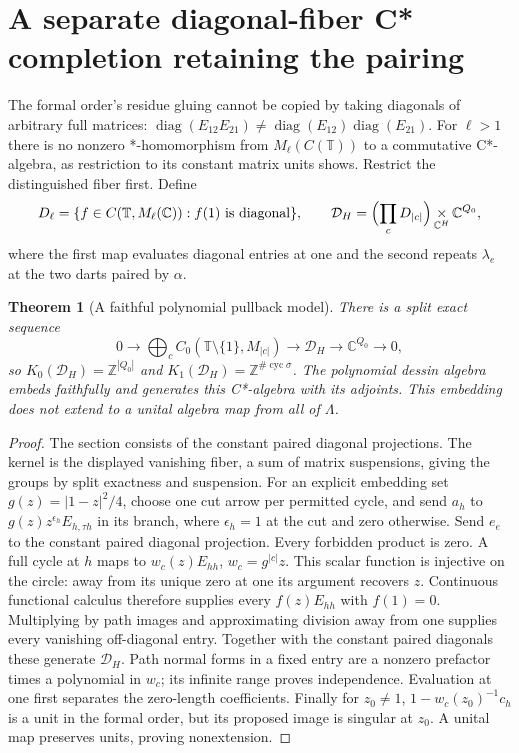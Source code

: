 \documentclass[11pt,oneside,openany]{book}
\newtheorem{theorem}{Theorem}[chapter]
\theoremstyle{definition}\newtheorem{definition}[theorem]{Definition}
\theoremstyle{remark}\newtheorem{remark}[theorem]{Remark}
\newcommand{\C}{\mathbb C}\newcommand{\Z}{\mathbb Z}\newcommand{\R}{\mathbb R}
\begin{document}
\section{A separate diagonal-fiber C* completion retaining the pairing}
The formal order's residue gluing cannot be copied by taking diagonals of arbitrary full matrices: $\operatorname{diag}(E_{12}E_{21})\ne\operatorname{diag}(E_{12})\operatorname{diag}(E_{21})$. For $\ell>1$ there is no nonzero *-homomorphism from $M_\ell(C(\mathbb T))$ to a commutative C*-algebra, as restriction to its constant matrix units shows. Restrict the distinguished fiber first. Define
\[
 D_\ell=\{f\in C(\mathbb T,M_\ell(\C)):f(1)\text{ is diagonal}\},\qquad
 \mathcal D_H=\Bigl(\prod_cD_{|c|}\Bigr)\mathop{\times}_{\C^H}\C^{Q_0},
\]
where the first map evaluates diagonal entries at one and the second repeats $\lambda_e$ at the two darts paired by $\alpha$.
\begin{theorem}[A faithful polynomial pullback model]\label{thm:diagonalmodel}
There is a split exact sequence
\[
 0\to\bigoplus_c C_0(\mathbb T\setminus\{1\},M_{|c|})
 \to\mathcal D_H\to\C^{Q_0}\to0,
\]
so $K_0(\mathcal D_H)=\Z^{|Q_0|}$ and $K_1(\mathcal D_H)=\Z^{\#\operatorname{cyc}\sigma}$. The polynomial dessin algebra embeds faithfully and generates this C*-algebra with its adjoints. This embedding does not extend to a unital algebra map from all of $\Lambda$.
\end{theorem}
\begin{proof}
The section consists of the constant paired diagonal projections. The kernel is the displayed vanishing fiber, a sum of matrix suspensions, giving the groups by split exactness and suspension. For an explicit embedding set $g(z)=|1-z|^2/4$, choose one cut arrow per permitted cycle, and send $a_h$ to $g(z)z^{\epsilon_h}E_{h,\tau h}$ in its branch, where $\epsilon_h=1$ at the cut and zero otherwise. Send $e_e$ to the constant paired diagonal projection. Every forbidden product is zero. A full cycle at $h$ maps to $w_c(z)E_{hh}$, $w_c=g^{|c|}z$. This scalar function is injective on the circle: away from its unique zero at one its argument recovers $z$. Continuous functional calculus therefore supplies every $f(z)E_{hh}$ with $f(1)=0$. Multiplying by path images and approximating division away from one supplies every vanishing off-diagonal entry. Together with the constant paired diagonals these generate $\mathcal D_H$. Path normal forms in a fixed entry are a nonzero prefactor times a polynomial in $w_c$; its infinite range proves independence. Evaluation at one first separates the zero-length coefficients. Finally for $z_0\ne1$, $1-w_c(z_0)^{-1}c_h$ is a unit in the formal order, but its proposed image is singular at $z_0$. A unital map preserves units, proving nonextension.
\end{proof}
\end{document}
